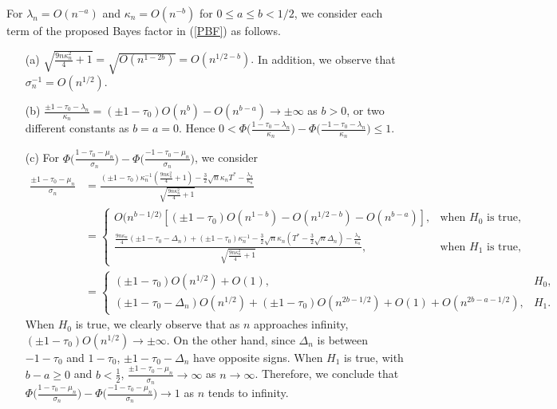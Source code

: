 \documentclass[11pt]{article}
\begin{document}
For $\lambda_n = O(n^{-a})$ and $\kappa_n = O(n^{-b})$ for $0\le a\le b <{1}/{2}$, we consider each term of the proposed Bayes factor in (\ref{PBF}) as follows.
\begin{enumerate}
    \item[(a)] $\sqrt{\frac{9n\kappa_n^2}{4}+1} = \sqrt{O(n^{1-2b})} = O(n^{1/2-b}).$ In addition, we observe that $\sigma_n^{-1} = O(n^{1/2})$.
    \item[(b)] $\frac{\pm 1-\tau_0-\lambda_n}{\kappa_n} = (\pm 1- \tau_0)O(n^b) - O(n^{b-a})\rightarrow \pm\infty$ as $b>0$, or two different constants as $b=a=0$. Hence  $0<\Phi\bigl(\frac{1-\tau_0-\lambda_n}{\kappa_n}\bigr)-\Phi\bigl(\frac{-1-\tau_0-\lambda_n}{\kappa_n}\bigr)\le 1$.
    \item[(c)] For  $\Phi\bigl(\frac{1-\tau_0-\mu_n}{\sigma_n}\bigr)-\Phi\bigl(\frac{-1-\tau_0-\mu_n}{\sigma_n}\bigr)$, we consider \begin{align*}
       \frac{\pm 1 -\tau_0 - \mu_n}{\sigma_n} &= \frac{(\pm 1-\tau_0)\kappa_n^{-1}\left(\frac{9n\kappa_n^2}{4}+1\right) -\frac{3}{2}\sqrt{n}\kappa_n T^* -\frac{\lambda_n}{\kappa_n}}{\sqrt{\frac{9n\kappa_n^2}{4}+1}} \\
       &=\begin{cases}
       O(n^{b-1/2)}\left[(\pm 1 -\tau_0)O(n^{1-b}) -O(n^{1/2-b}) -O(n^{b-a})\right],& \text{when $H_0$ is true},\\\frac{\frac{9n\kappa_n}{4}\left(\pm 1 -\tau_0-\Delta_n\right) +(\pm 1 -\tau_0)\kappa_n^{-1}-\frac{3}{2}\sqrt{n}\kappa_n\left(T^* - \frac{3}{2}\sqrt{n}\Delta_n\right)-\frac{\lambda_n}{\kappa_n}}{\sqrt{\frac{9n\kappa_n^2}{4}+1}},&\text{when $H_1$ is true},
       \end{cases}\\
       &= \begin{cases}
       (\pm 1 -\tau_0)O(n^{1/2}) + O(1),& H_0,\\(\pm 1 -\tau_0 -\Delta_n)O(n^{1/2}) +(\pm 1-\tau_0)O(n^{2b-1/2}) +O(1) + O(n^{2b-a-1/2}),&H_1.
       \end{cases}
    \end{align*}
When $H_0$ is true, we clearly observe that as $n$ approaches infinity,  $(\pm 1 -\tau_0)O(n^{1/2})\rightarrow\pm \infty$. On the other hand, since $\Delta_n$ is between $-1-\tau_0$ and $1-\tau_0$, $\pm 1-\tau_0 -\Delta_n$ have opposite signs. When $H_1$ is true, with $b-a\ge 0$ and $b<\frac{1}{2}$, $\frac{\pm 1 -\tau_0 - \mu_n}{\sigma_n}\rightarrow\infty$ as $n\rightarrow\infty$. Therefore, we conclude that $\Phi\bigl(\frac{1-\tau_0-\mu_n}{\sigma_n}\bigr)-\Phi\bigl(\frac{-1-\tau_0-\mu_n}{\sigma_n}\bigr)\rightarrow 1$ as $n$ tends to infinity.

\end{enumerate}
\end{document}
